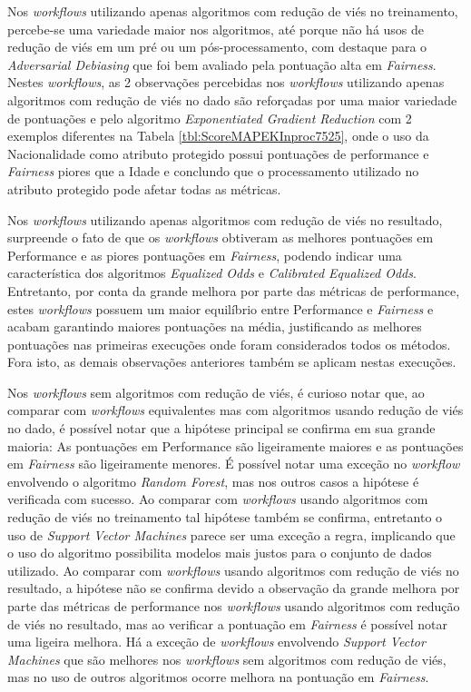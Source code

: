 \documentclass{article}
\begin{document}
Nos \textit{workflows} utilizando apenas algoritmos com redução de viés no treinamento, percebe-se uma variedade maior nos algoritmos, até porque não há usos de redução de viés em um pré ou um pós-processamento, com destaque para o \textit{Adversarial Debiasing} que foi bem avaliado pela pontuação alta em \textit{Fairness}. Nestes \textit{workflows}, as 2 observações percebidas nos \textit{workflows} utilizando apenas algoritmos com redução de viés no dado são reforçadas por uma maior variedade de pontuações e pelo algoritmo \textit{Exponentiated Gradient Reduction} com 2 exemplos diferentes na Tabela \ref{tbl:ScoreMAPEKInproc7525}, onde o uso da Nacionalidade como atributo protegido possui pontuações de performance e \textit{Fairness} piores que a Idade e conclundo que o processamento utilizado no atributo protegido pode afetar todas as métricas.

Nos \textit{workflows} utilizando apenas algoritmos com redução de viés no resultado, surpreende o fato de que os \textit{workflows} obtiveram as melhores pontuações em Performance e as piores pontuações em \textit{Fairness}, podendo indicar uma característica dos algoritmos \textit{Equalized Odds} e \textit{Calibrated Equalized Odds}. Entretanto, por conta da grande melhora por parte das métricas de performance, estes \textit{workflows} possuem um maior equilíbrio entre Performance e \textit{Fairness} e acabam garantindo maiores pontuações na média, justificando as melhores pontuações nas primeiras execuções onde foram considerados todos os métodos. Fora isto, as demais observações anteriores também se aplicam nestas execuções.

Nos \textit{workflows} sem algoritmos com redução de viés, é curioso notar que, ao comparar com \textit{workflows} equivalentes mas com algoritmos usando redução de viés no dado, é possível notar que a hipótese principal se confirma em sua grande maioria: As pontuações em Performance são ligeiramente maiores e as pontuações em \textit{Fairness} são ligeiramente menores. É possível notar uma exceção no \textit{workflow} envolvendo o algoritmo \textit{Random Forest}, mas nos outros casos a hipótese é verificada com sucesso. Ao comparar com \textit{workflows} usando algoritmos com redução de viés no treinamento tal hipótese também se confirma, entretanto o uso de \textit{Support Vector Machines} parece ser uma exceção a regra, implicando que o uso do algoritmo possibilita modelos mais justos para o conjunto de dados utilizado. Ao comparar com \textit{workflows} usando algoritmos com redução de viés no resultado, a hipótese não se confirma devido a observação da grande melhora por parte das métricas de performance nos \textit{workflows} usando algoritmos com redução de viés no resultado, mas ao verificar a pontuação em \textit{Fairness} é possível notar uma ligeira melhora. Há a exceção de \textit{workflows} envolvendo \textit{Support Vector Machines} que são melhores nos \textit{workflows} sem algoritmos com redução de viés, mas no uso de outros algoritmos ocorre melhora na pontuação em \textit{Fairness}.
\end{document}
